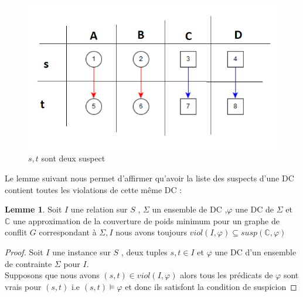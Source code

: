 \documentclass[letterpaper, 12pt]{report}
\theoremstyle{definition}
\newtheorem{mylemma}{Lemme}
\begin{document}
\begin{figure}
\centering
\includegraphics[scale=1]{img/suspect1.png}
\caption{\label{suspect1} $s,t$ sont deux suspect }
\end{figure}

Le lemme suivant nous permet d'affirmer qu'avoir la liste des suspects d'une DC contient toutes les violations de cette même DC \cite{main} :
\begin{mylemma}
Soit $I$ une relation sur $S$ , $\Sigma$ un ensemble de DC ,$\varphi$ une DC de $\Sigma$ et $\mathbb{C}$ une approximation de la couverture de poids minimum pour un graphe de conflit $G$ correspondant à  $\Sigma,I$ nous avons toujours $viol(I,\varphi) \subseteq susp(\mathbb{C},\varphi)$
 \end{mylemma}
 
 \begin{proof}
 Soit $I$ une instance sur $S$ , deux tuples $s,t \in I$ et $\varphi$ une DC d'un ensemble de contrainte $\Sigma$ pour $I$.\\
 Supposons que nous avons $(s,t) \in viol(I,\varphi)$ alors tous les prédicats de $\varphi$ sont vrais pour $(s,t)$ i.e $(s,t) \models \varphi$ et donc ils satisfont la condition de suspicion
 \end{proof}
 
\end{document}
